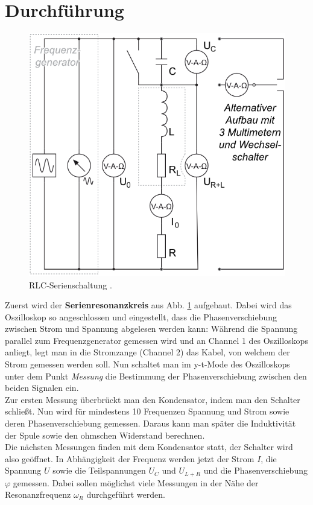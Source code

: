 \documentclass[12pt,a4paper,titlepage,headinclude,bibtotoc]{scrartcl}
\begin{document}
\section{Durchführung}
\label{sec:durchfuehrung}
\begin{figure}[!htb]
	\centering
	\includegraphics[scale=0.6]{serie.png}
	\caption{RLC-Serienschaltung \cite[Datum: 03.10.14]{LP14}.}
	\label{fig:serie}
\end{figure}

Zuerst wird der \textbf{Serienresonanzkreis} aus Abb. \ref{fig:serie} aufgebaut.
Dabei wird das Oszilloskop so angeschlossen und eingestellt, dass die Phasenverschiebung zwischen Strom und Spannung abgelesen werden kann:
Während die Spannung parallel zum Frequenzgenerator gemessen wird und an Channel 1 des Oszilloskops anliegt, legt man in die Stromzange (Channel 2) das Kabel, von welchem der Strom gemessen werden soll.
Nun schaltet man im y-t-Mode des Oszilloskops unter dem Punkt \emph{Messung} die Bestimmung der Phasenverschiebung zwischen den beiden Signalen ein.\\
Zur ersten Messung überbrückt man den Kondensator, indem man den Schalter schließt.
Nun wird für mindestens 10 Frequenzen Spannung und Strom sowie deren Phasenverschiebung gemessen.
Daraus kann man später die Induktivität der Spule sowie den ohmschen Widerstand berechnen.\\
Die nächsten Messungen finden mit dem Kondensator statt, der Schalter wird also geöffnet.
In Abhängigkeit der Frequenz werden jetzt der Strom $I$, die Spannung $U$ sowie die Teilspannungen $U_C$ und $U_{L+R}$ und die Phasenverschiebung $\varphi$ gemessen.
Dabei sollen möglichst viele Messungen in der Nähe der Resonanzfrequenz $\omega_R$ durchgeführt werden.\\
\end{document}
